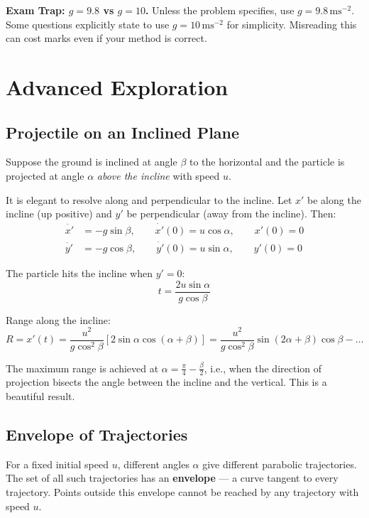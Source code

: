 \documentclass[12pt, a4paper]{book}
\newcommand{\mss}{\,\mathrm{ms}^{-2}}
\begin{document}
\begin{examtrap}
\textbf{Exam Trap: $g = 9.8$ vs $g = 10$.}
Unless the problem specifies, use $g = 9.8\mss$. Some questions explicitly state to use $g = 10\mss$ for simplicity. Misreading this can cost marks even if your method is correct.
\end{examtrap}

\section{Advanced Exploration}

\subsection{Projectile on an Inclined Plane}

Suppose the ground is inclined at angle $\beta$ to the horizontal and the particle is projected at angle $\alpha$ \emph{above the incline} with speed $u$.

\begin{explorationbox}
It is elegant to resolve along and perpendicular to the incline. Let $x'$ be along the incline (up positive) and $y'$ be perpendicular (away from the incline). Then:
\begin{align*}
  \ddot{x'} &= -g\sin\beta, \qquad \dot{x'}(0) = u\cos\alpha, \qquad x'(0) = 0 \\
  \ddot{y'} &= -g\cos\beta, \qquad \dot{y'}(0) = u\sin\alpha, \qquad y'(0) = 0
\end{align*}

The particle hits the incline when $y' = 0$:
\[
  t = \frac{2u\sin\alpha}{g\cos\beta}
\]

Range along the incline:
\[
  R = x'(t) = \frac{u^2}{g\cos^2\beta}\left[2\sin\alpha\cos(\alpha+\beta)\right] = \frac{u^2}{g\cos^2\beta}\sin(2\alpha+\beta)\cos\beta - \ldots
\]

The maximum range is achieved at $\alpha = \frac{\pi}{4} - \frac{\beta}{2}$, i.e., when the direction of projection bisects the angle between the incline and the vertical. This is a beautiful result.
\end{explorationbox}

\subsection{Envelope of Trajectories}

For a fixed initial speed $u$, different angles $\alpha$ give different parabolic trajectories. The set of all such trajectories has an \textbf{envelope} --- a curve tangent to every trajectory. Points outside this envelope cannot be reached by any trajectory with speed $u$.
\end{document}
